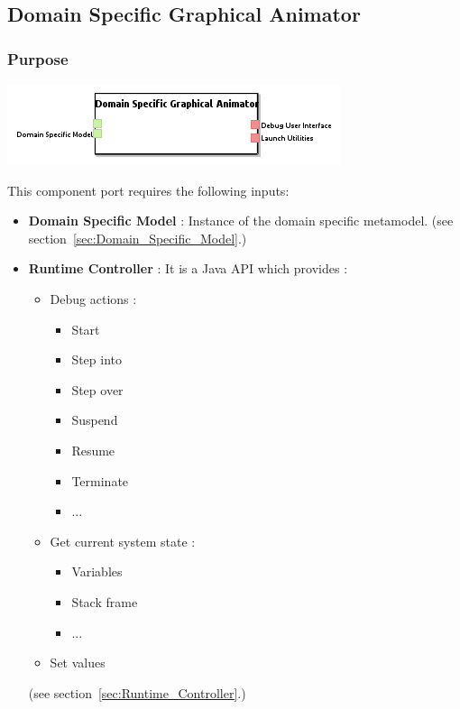 \documentclass{gemoc} %
\begin{document}
\subsection{Domain Specific Graphical Animator}
\label{sec:Domain_Specific_Graphical_Animator}


\subsubsection{Purpose}


\begin{center}
\includegraphics*[trim=0.0cm 0.0cm 0cm 0.0cm, clip=true]{../images/generated/Generated_Domain_Specific_Graphical_Animator.png}
\end{center}

This component port requires the following inputs:
\begin{itemize}
  \item \textbf{Domain Specific Model} :
Instance of the domain specific metamodel.
(see section~\ref{sec:Domain_Specific_Model}.)
  \item \textbf{Runtime Controller} :
It is a Java API which provides :
\begin{itemize}
\item Debug actions :
\begin{itemize}
\item Start
\item Step into
\item Step over
\item Suspend
\item Resume
\item Terminate
\item ...
\end{itemize}
\item Get current system state :
\begin{itemize}
\item Variables
\item Stack frame
\item ...
\end{itemize}
\item Set values
\end{itemize}
(see section~\ref{sec:Runtime_Controller}.)
\end{itemize}
\end{document}
